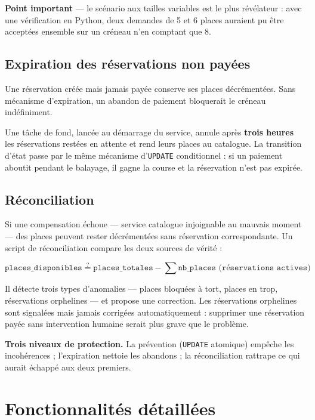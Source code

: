 \documentclass[11pt,a4paper]{report}
\newcommand{\tbnote}[1]{\par\vspace{4pt}\noindent%
  \colorbox{tbSand}{\parbox{\dimexpr\linewidth-2\fboxsep}{\small #1}}\par\vspace{4pt}}
\begin{document}
\tbnote{\textbf{Point important} — le scénario aux tailles variables est le plus
révélateur : avec une vérification en Python, deux demandes de 5 et 6 places
auraient pu être acceptées ensemble sur un créneau n'en comptant que 8.}

\section{Expiration des réservations non payées}

Une réservation créée mais jamais payée conserve ses places décrémentées. Sans
mécanisme d'expiration, un abandon de paiement bloquerait le créneau
indéfiniment.

Une tâche de fond, lancée au démarrage du service, annule après
\textbf{trois heures} les réservations restées en attente et rend leurs places
au catalogue. La transition d'état passe par le même mécanisme d'\texttt{UPDATE}
conditionnel : si un paiement aboutit pendant le balayage, il gagne la course et
la réservation n'est pas expirée.

\section{Réconciliation}

Si une compensation échoue — service catalogue injoignable au mauvais moment —
des places peuvent rester décrémentées sans réservation correspondante. Un
script de réconciliation compare les deux sources de vérité :

\[
\texttt{places\_disponibles} \stackrel{?}{=} \texttt{places\_totales} -
\sum \texttt{nb\_places (réservations actives)}
\]

Il détecte trois types d'anomalies — places bloquées à tort, places en trop,
réservations orphelines — et propose une correction. Les réservations
orphelines sont signalées mais jamais corrigées automatiquement : supprimer une
réservation payée sans intervention humaine serait plus grave que le problème.

\tbnote{\textbf{Trois niveaux de protection.} La prévention (\texttt{UPDATE}
atomique) empêche les incohérences ; l'expiration nettoie les abandons ; la
réconciliation rattrape ce qui aurait échappé aux deux premiers.}

\chapter{Fonctionnalités détaillées}
\end{document}

